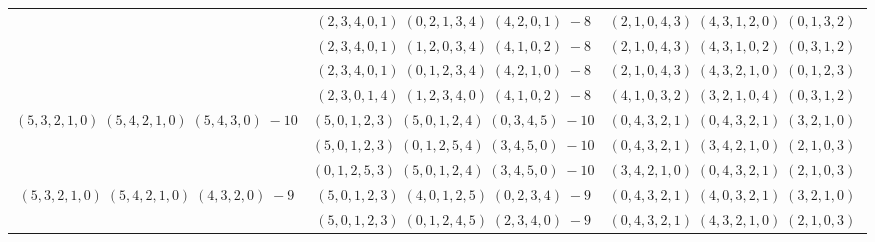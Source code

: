 \documentclass[11pt]{article}
\begin{document}
\begin{longtable}[l]{|c|c|c|}
 \cline{2-3} 
 & $(2 ,3 ,4 ,0 ,1) \;(0 ,2 ,1 ,3 ,4) \;(4 ,2 ,0 ,1) \;-8$ & $(2 ,1 ,0 ,4 ,3) \;(4 ,3 ,1 ,2 ,0) \;(0 ,1 ,3 ,2) \;$\\ 
 \cline{2-3} 
 & $(2 ,3 ,4 ,0 ,1) \;(1 ,2 ,0 ,3 ,4) \;(4 ,1 ,0 ,2) \;-8$ & $(2 ,1 ,0 ,4 ,3) \;(4 ,3 ,1 ,0 ,2) \;(0 ,3 ,1 ,2) \;$\\ 
 \cline{2-3} 
 & $(2 ,3 ,4 ,0 ,1) \;(0 ,1 ,2 ,3 ,4) \;(4 ,2 ,1 ,0) \;-8$ & $(2 ,1 ,0 ,4 ,3) \;(4 ,3 ,2 ,1 ,0) \;(0 ,1 ,2 ,3) \;$\\ 
 \cline{2-3} 
 & $(2 ,3 ,0 ,1 ,4) \;(1 ,2 ,3 ,4 ,0) \;(4 ,1 ,0 ,2) \;-8$ & $(4 ,1 ,0 ,3 ,2) \;(3 ,2 ,1 ,0 ,4) \;(0 ,3 ,1 ,2) \;$\\ \hline\multirow[t]{3}{*}{ $(5 ,3 ,2 ,1 ,0) \;(5 ,4 ,2 ,1 ,0) \;(5 ,4 ,3 ,0) \;-10$ }  & $(5 ,0 ,1 ,2 ,3) \;(5 ,0 ,1 ,2 ,4) \;(0 ,3 ,4 ,5) \;-10$ & $(0 ,4 ,3 ,2 ,1) \;(0 ,4 ,3 ,2 ,1) \;(3 ,2 ,1 ,0) \;$\\ 
 \cline{2-3} 
 & $(5 ,0 ,1 ,2 ,3) \;(0 ,1 ,2 ,5 ,4) \;(3 ,4 ,5 ,0) \;-10$ & $(0 ,4 ,3 ,2 ,1) \;(3 ,4 ,2 ,1 ,0) \;(2 ,1 ,0 ,3) \;$\\ 
 \cline{2-3} 
 & $(0 ,1 ,2 ,5 ,3) \;(5 ,0 ,1 ,2 ,4) \;(3 ,4 ,5 ,0) \;-10$ & $(3 ,4 ,2 ,1 ,0) \;(0 ,4 ,3 ,2 ,1) \;(2 ,1 ,0 ,3) \;$\\ \hline\multirow[t]{2}{*}{ $(5 ,3 ,2 ,1 ,0) \;(5 ,4 ,2 ,1 ,0) \;(4 ,3 ,2 ,0) \;-9$ }  & $(5 ,0 ,1 ,2 ,3) \;(4 ,0 ,1 ,2 ,5) \;(0 ,2 ,3 ,4) \;-9$ & $(0 ,4 ,3 ,2 ,1) \;(4 ,0 ,3 ,2 ,1) \;(3 ,2 ,1 ,0) \;$\\ 
 \cline{2-3} 
 & $(5 ,0 ,1 ,2 ,3) \;(0 ,1 ,2 ,4 ,5) \;(2 ,3 ,4 ,0) \;-9$ & $(0 ,4 ,3 ,2 ,1) \;(4 ,3 ,2 ,1 ,0) \;(2 ,1 ,0 ,3) \;$\\ \hline
  
 \end{longtable} 
 
\end{document}
